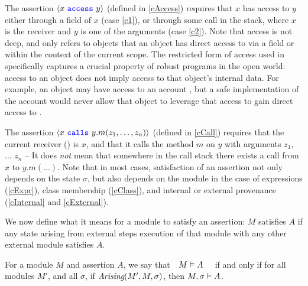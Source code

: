  
The assertion ${\langle x\ {\color{blue}\texttt{access}}\ y \rangle}$ (defined in  \ref{cAccess})
requires  that $x$ has access to $y$
either through a field of $x$ (case \ref{c1}),
or through some call in the stack, where $x$ is the receiver and $y$ is one of the
arguments (case \ref{c2}).
{Note that access is not deep, and only refers to objects that 
an object has direct access to via a field or within the context of the current scope. 
 The restricted form of access used in \Nec specifically captures a crucial property of robust programs in the open world: access to an object does not imply access to that object's internal data. For example, an object may have access to an account , but a safe implementation of the account would never allow that object to leverage that access to gain direct access to {}}.
 
 The assertion %
 ${\langle x\ {\color{blue}\texttt{calls}}\ y.m(z_1, \ldots, z_n) \rangle}$  (defined in \ref{cCall}) 
requires that the current receiver () is $x$, and that it calls the method $m$ on $y$ with
 arguments $z_1$, ... $z_n$ -- It does \emph{not} mean  that somewhere in the 
 call stack there exists a call from $x$ to $y.m(...)$. 
 Note that in most cases, satisfaction of an assertion not only depends on the state $\sigma$, but 
also depends on the module in the case of expressions (\ref{cExpr}), class membership
(\ref{cClass}), and internal or external provenance (\ref{cInternal} and \ref{cExternal}).


We now define what it means for a module to satisfy an assertion:
 $M$ satisfies  $A$ if any state arising from external steps execution of that
module with any other external module  satisfies $A$. 
 
\begin{definition}  
\label{def:mdl-sat}
For a module $M$ and assertion $A$, we say that\ \  $M \vDash A$ \ \ if and only if 
for all modules $M'$, and all $\sigma$, if $\textit{Arising}(M', M, \sigma)$, then $M , \sigma \vDash A$.
\end{definition}

